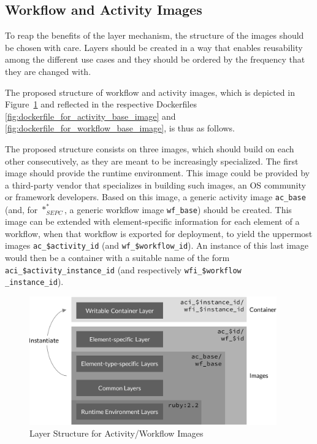 
\subsection{Workflow and Activity Images} %
\label{sub:workflow_activity_images}
  To reap the benefits of the layer mechanism, the structure of the images should be chosen with care. Layers should be created in a way that enables reusability among the different use cases and they should be ordered by the frequency that they are changed with.

  The proposed structure of workflow and activity images, which is depicted in Figure~\ref{fig:layers_for_element_wrapping_containers} and reflected in the respective Dockerfiles \ref{fig:dockerfile_for_activity_base_image} and \ref{fig:dockerfile_for_workflow_base_image}, is thus as follows.

  The proposed structure consists on three images, which should build on each other consecutively, as they are meant to be increasingly specialized. The first image should provide the runtime environment. This image could be provided by a third-party vendor that specializes in building such images, \ie an \ac{OS} community or framework developers. Based on this image, a generic activity image \texttt{ac\_base} (and, for $*_{SEPC}^{*}$, a generic workflow image \texttt{wf\_base}) should be created. This image can be extended with element-specific information for each element of a workflow, when that workflow is exported for deployment, to yield the uppermost images \texttt{ac\_\$activity\_id} (and \texttt{wf\_\$workflow\_id}). An instance of this last image would then be a container with a suitable name of the form \texttt{aci\_\$activity\_instance\_id} (and respectively \texttt{wfi\_\$workflow\\\_instance\_id}).

  \begin{figure}[htbp]
    \centering
    \includegraphics[width=0.95\textwidth]{content/images/layer_concept-crop.pdf}
    \caption{Layer Structure for Activity/Workflow Images}
    \label{fig:layers_for_element_wrapping_containers}
  \end{figure}

